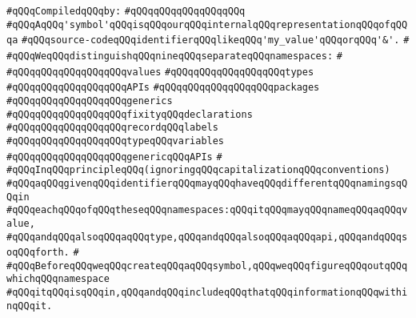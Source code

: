 \newline
\verb|#qQQqCompiledqQQqby:|\newline
\verb|#qQQqqQQqqQQqqQQqqQQq|\newline
\newline
\newline
\newline
\verb|#qQQqAqQQq'symbol'qQQqisqQQqourqQQqinternalqQQqrepresentationqQQqofqQQqa|\newline
\verb|#qQQqsource-codeqQQqidentifierqQQqlikeqQQq'my_value'qQQqorqQQq'&'.|\newline
\verb|#|\newline
\verb|#qQQqWeqQQqdistinguishqQQqnineqQQqseparateqQQqnamespaces:|\newline
\verb|#|\newline
\verb|#qQQqqQQqqQQqqQQqqQQqvalues|\newline
\verb|#qQQqqQQqqQQqqQQqqQQqtypes|\newline
\verb|#qQQqqQQqqQQqqQQqqQQqAPIs|\newline
\verb|#qQQqqQQqqQQqqQQqqQQqpackages|\newline
\verb|#qQQqqQQqqQQqqQQqqQQqgenerics|\newline
\verb|#qQQqqQQqqQQqqQQqqQQqfixityqQQqdeclarations|\newline
\verb|#qQQqqQQqqQQqqQQqqQQqrecordqQQqlabels|\newline
\verb|#qQQqqQQqqQQqqQQqqQQqtypeqQQqvariables|\newline
\verb|#qQQqqQQqqQQqqQQqqQQqgenericqQQqAPIs|\newline
\verb|#|\newline
\verb|#qQQqInqQQqprincipleqQQq(ignoringqQQqcapitalizationqQQqconventions)|\newline
\verb|#qQQqaqQQqgivenqQQqidentifierqQQqmayqQQqhaveqQQqdifferentqQQqnamingsqQQqin|\newline
\verb|#qQQqeachqQQqofqQQqtheseqQQqnamespaces:qQQqitqQQqmayqQQqnameqQQqaqQQqvalue,|\newline
\verb|#qQQqandqQQqalsoqQQqaqQQqtype,qQQqandqQQqalsoqQQqaqQQqapi,qQQqandqQQqsoqQQqforth.|\newline
\verb|#|\newline
\verb|#qQQqBeforeqQQqweqQQqcreateqQQqaqQQqsymbol,qQQqweqQQqfigureqQQqoutqQQqwhichqQQqnamespace|\newline
\verb|#qQQqitqQQqisqQQqin,qQQqandqQQqincludeqQQqthatqQQqinformationqQQqwithinqQQqit.|\newline
